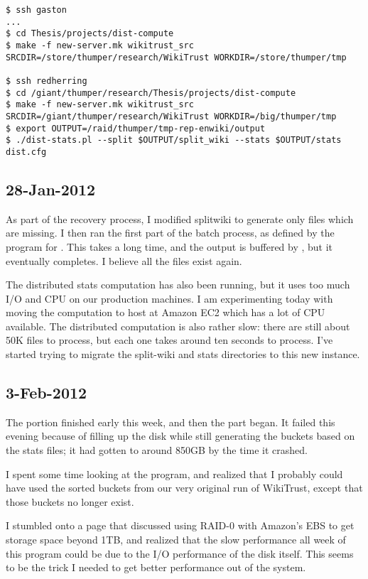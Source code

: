 \begin{verbatim}
$ ssh gaston
...
$ cd Thesis/projects/dist-compute
$ make -f new-server.mk wikitrust_src SRCDIR=/store/thumper/research/WikiTrust WORKDIR=/store/thumper/tmp

$ ssh redherring
$ cd /giant/thumper/research/Thesis/projects/dist-compute
$ make -f new-server.mk wikitrust_src SRCDIR=/giant/thumper/research/WikiTrust WORKDIR=/big/thumper/tmp
$ export OUTPUT=/raid/thumper/tmp-rep-enwiki/output
$ ./dist-stats.pl --split $OUTPUT/split_wiki --stats $OUTPUT/stats dist.cfg
\end{verbatim}

\subsection{28-Jan-2012}

As part of the recovery process, I modified splitwiki to generate only
files which are missing.
I then ran the first part of the batch process, as defined by the
 program for .
This takes a long time, and the output is buffered by
, but it eventually completes.
I believe all the files exist again.

The distributed stats computation has also been running, but it uses
too much I/O and CPU on our production machines.
I am experimenting today with moving the computation to host at
Amazon EC2 which has a lot of CPU available.
The distributed computation is also rather slow: there are still
about 50K files to process, but each one takes around ten seconds
to process.
I've started trying to migrate the split-wiki and stats directories
to this new instance.

\subsection{3-Feb-2012}

The  portion finished early this week, and then the
 part began.
It failed this evening because of filling up the disk while still
generating the buckets based on the stats files; it had gotten to
around 850GB by the time it crashed.

I spent some time looking at the  program,
and realized that I probably could have used the sorted buckets
from our very original run of WikiTrust, except that those buckets
no longer exist.

I stumbled onto a page that discussed using RAID-0 with Amazon's EBS to
get storage space beyond 1TB, and realized that the slow performance all
week of this program could be due to the I/O performance of the disk itself.
This seems to be the trick I needed to get better performance out of the
system.

